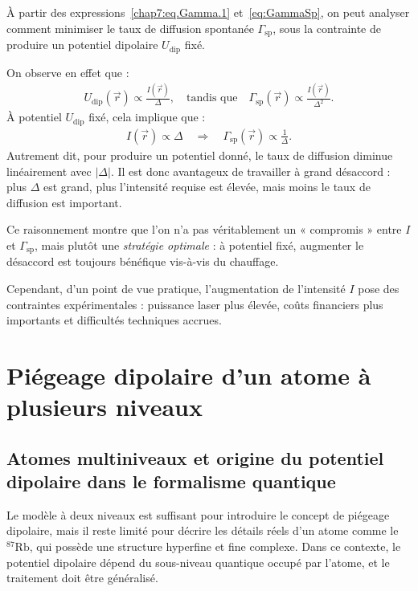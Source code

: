 À partir des expressions~\eqref{chap7:eq.Gamma.1} et~\eqref{eq:GammaSp}, on peut analyser comment minimiser le taux de diffusion spontanée \( \Gamma_{\mathrm{sp}} \), sous la contrainte de produire un potentiel dipolaire \( U_{\mathrm{dip}} \) fixé.

On observe en effet que :
\begin{eqnarray}
	U_{\mathrm{dip}}(\vec{r}) \propto \frac{I(\vec{r})}{\Delta}, \quad \text{tandis que} \quad \Gamma_{\mathrm{sp}}(\vec{r}) \propto \frac{I(\vec{r})}{\Delta^2}.	
\end{eqnarray}
À potentiel \( U_{\mathrm{dip}} \) fixé, cela implique que :
\begin{eqnarray}
	I(\vec{r}) \propto \Delta \quad \Rightarrow \quad \Gamma_{\mathrm{sp}}(\vec{r}) \propto \frac{1}{\Delta}.
\end{eqnarray}
Autrement dit, pour produire un potentiel donné, le taux de diffusion diminue linéairement avec \( |\Delta| \). Il est donc avantageux de travailler à grand désaccord : plus \( \Delta \) est grand, plus l’intensité requise est élevée, mais moins le taux de diffusion est important.

\medskip

Ce raisonnement montre que l’on n’a pas véritablement un « compromis » entre \( I \) et \( \Gamma_{\mathrm{sp}} \), mais plutôt une {\em stratégie optimale} : à potentiel fixé, augmenter le désaccord est toujours bénéfique vis-à-vis du chauffage.

\medskip

Cependant, d’un point de vue pratique, l’augmentation de l’intensité \(I\) pose des contraintes expérimentales : puissance laser plus élevée, coûts financiers plus importants et difficultés techniques accrues. 



\section{Piégeage dipolaire d’un atome à plusieurs niveaux}

\subsection{Atomes multiniveaux et origine du potentiel dipolaire dans le formalisme quantique}

Le modèle à deux niveaux est suffisant pour introduire le concept de piégeage dipolaire, mais il reste limité pour décrire les détails réels d'un atome comme le \({}^{87}\mathrm{Rb}\), qui possède une structure hyperfine et fine complexe. Dans ce contexte, le potentiel dipolaire dépend du sous-niveau quantique occupé par l’atome, et le traitement doit être généralisé.

